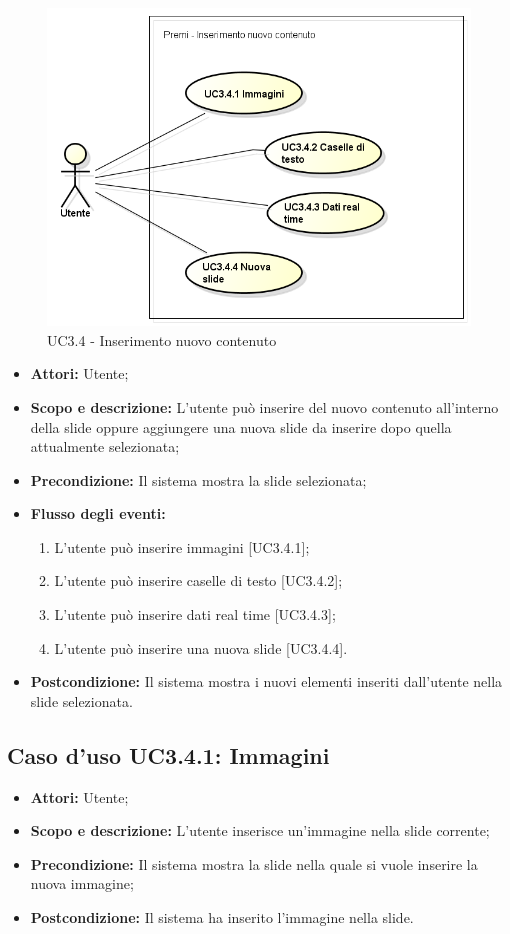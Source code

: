\begin{figure}[h] 
	\centering 
	\includegraphics[scale=0.45] {img/UC3.4.png} 
	\caption{UC3.4 - Inserimento nuovo contenuto} 
\end{figure}


\begin{itemize}
	\item \textbf{Attori:} Utente;
	\item \textbf{Scopo e descrizione:} L'utente può inserire del nuovo contenuto all'interno della slide oppure aggiungere una nuova slide da inserire dopo quella attualmente selezionata;
	\item \textbf{Precondizione:} Il sistema mostra la slide selezionata;
	\item \textbf{Flusso degli eventi:}
	\begin{enumerate}
		\item L'utente può inserire immagini [UC3.4.1];
		\item L'utente può inserire caselle di testo [UC3.4.2];
		\item L'utente può inserire dati real time [UC3.4.3];
		\item L'utente può inserire una nuova slide [UC3.4.4].
	\end{enumerate}
	\item \textbf{Postcondizione:} Il sistema mostra i nuovi elementi inseriti dall'utente nella slide selezionata.
\end{itemize}


\subsection{Caso d'uso UC3.4.1: Immagini}
\begin{itemize}
	\item \textbf{Attori:} Utente;
	\item \textbf{Scopo e descrizione:} L'utente inserisce un'immagine nella slide corrente;
	\item \textbf{Precondizione:} Il sistema mostra la slide nella quale si vuole inserire la nuova immagine;
	\item \textbf{Postcondizione:} Il sistema ha inserito l'immagine nella slide.
\end{itemize}

